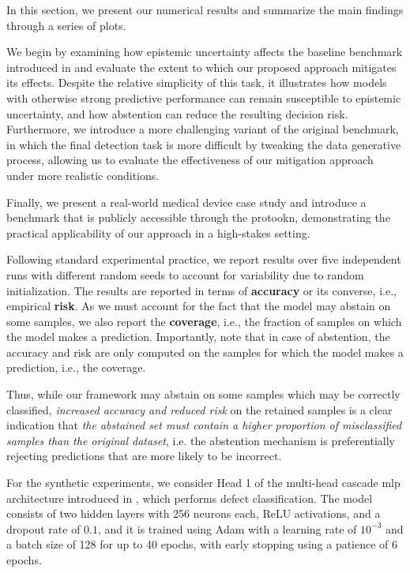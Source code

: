 

In this section, we present our numerical results and summarize the main findings through a series of plots.

We begin by examining how epistemic uncertainty affects the baseline benchmark introduced in \cite{shenoy2026uncertainty} and evaluate the extent to which our proposed approach mitigates its effects. Despite the relative simplicity of this task, it illustrates how models with otherwise strong predictive performance can remain susceptible to epistemic uncertainty, and how abstention can reduce the resulting decision risk. Furthermore, we introduce a more challenging variant of the original benchmark, in which the final detection task is more difficult by tweaking the data generative process, allowing us to evaluate the effectiveness of our mitigation approach under more realistic conditions.

Finally, we present a real-world medical device case study and introduce a benchmark that is publicly accessible through the \gls*{protookn}, demonstrating the practical applicability of our approach in a high-stakes setting.

Following standard experimental practice, we report results over five independent runs with different random seeds to account for variability due to random initialization.
The results are reported in terms of \textbf{accuracy} or its converse, i.e., empirical \textbf{risk}. As we must account for the fact that the model may abstain on some samples, we also report the \textbf{coverage}, i.e., the fraction of samples on which the model makes a prediction. Importantly, note that in case of abstention, the accuracy and risk are only computed on the samples for which the model makes a prediction, i.e., the coverage.

Thus, while our framework may abstain on some samples which may be correctly classified, \emph{increased accuracy and reduced risk} on the retained samples is a clear indication that \emph{the abstained set must contain a higher proportion of misclassified samples than the original dataset}, i.e. the abstention mechanism is preferentially rejecting predictions that are more likely to be incorrect.

For the synthetic experiments, we consider Head 1 of the multi-head cascade \gls*{mlp} architecture introduced in \cite{shenoy2026uncertainty}, which performs defect classification. The model consists of two hidden layers with 256 neurons each, ReLU activations, and a dropout rate of \(0.1\), and it is trained using Adam with a learning rate of \(10^{-3}\) and a batch size of 128 for up to 40 epochs, with early stopping using a patience of 6 epochs.

